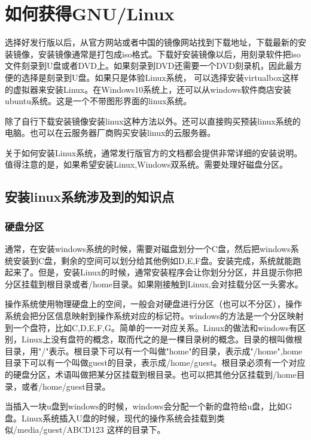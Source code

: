 \documentclass[UTF8]{ctexart}
\begin{document}
\section{\msyh 如何获得GNU/Linux}

选择好发行版以后，从官方网站或者中国的镜像网站找到下载地址，下载最新的安装镜像，安装镜像通常是打包成iso格式。下载好安装镜像以后，用刻录软件把iso文件刻录到U盘或者DVD上。如果刻录到DVD还需要一个DVD刻录机，因此最方便的选择是刻录到U盘。如果只是体验Linux系统，
可以选择安装virtualbox这样的虚拟器来安装Linux。在Windows10系统上，还可以从windows软件商店安装ubuntu系统。这是一个不带图形界面的linux系统。
\par
除了自行下载安装镜像安装linux这种方法以外。还可以直接购买预装linux系统的电脑。也可以在云服务器厂商购买安装linux的云服务器。

\par

关于如何安装Linux系统，通常发行版官方的文档都会提供非常详细的安装说明。值得注意的是，如果希望安装Linux,Windows双系统。需要处理好磁盘分区。

\subsection{\msyh 安装linux系统涉及到的知识点}
\subsubsection{\msyh 硬盘分区}
通常，在安装windows系统的时候，需要对磁盘划分一个C盘，然后把windows系统安装到C盘，剩余的空间可以划分给其他例如D,E,F盘。安装完成，系统就能跑起来了。但是，安装Linux的时候，通常安装程序会让你划分分区，并且提示你把分区挂载到根目录或者/home目录。如果刚接触到Linux,会对挂载分区一头雾水。
\par


操作系统使用物理硬盘上的空间，一般会对硬盘进行分区（也可以不分区），操作系统会把分区信息映射到操作系统对应的标记符。windows的方法是一个分区映射到一个盘符，比如C,D,E,F,G。简单的一一对应关系。Linux的做法和windows有区别，Linux上没有盘符的概念，取而代之的是一棵目录树的概念。目录的根叫做根目录，用"/"表示。根目录下可以有一个叫做"home"的目录，表示成"/home",home目录下可以有一个叫做guest的目录，表示成/home/guest。根目录必须有一个对应的硬盘分区，术语叫做把某分区挂载到根目录。也可以把其他分区挂载到/home目录，或者/home/guest目录。
\par
当插入一块u盘到windows的时候，windows会分配一个新的盘符给u盘，比如G盘。Linux系统插入U盘的时候，现代的操作系统会挂载到类似/media/guest/ABCD123 这样的目录下。
\end{document}
